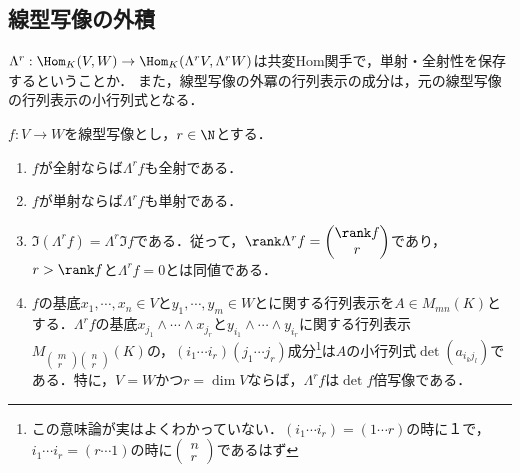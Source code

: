 \documentclass[uplatex, dvipdfmx]{jsreport}
\begin{document}
\subsection{線型写像の外積}

\begin{tcolorbox}[colframe=ForestGreen, colback=ForestGreen!10!white, breakable,
    title=線型写像の外積の構成は共変Hom関手]
    $\Lambda^r:\Hom_K(V,W)\to\Hom_K(\Lambda^rV,\Lambda^rW)$は共変Hom関手で，単射・全射性を保存するということか．
    また，線型写像の外冪の行列表示の成分は，元の線型写像の行列表示の小行列式となる．
\end{tcolorbox}

\begin{proposition}[線型写像の外積の構成は共変Hom関手]
    $f:V\to W$を線型写像とし，$r\in\N$とする．
    \begin{enumerate}
        \item $f$が全射ならば$\Lambda^rf$も全射である．
        \item $f$が単射ならば$\Lambda^rf$も単射である．
        \item $\Im(\Lambda^rf)=\Lambda^r\Im f$である．従って，$\rank\Lambda^rf=\begin{pmatrix}\rank f\\r\end{pmatrix}$であり，$r>\rank f$と$\Lambda^rf=0$とは同値である．
        \item $f$の基底$x_1,\cdots,x_n\in V$と$y_1,\cdots,y_m\in W$とに関する行列表示を$A\in M_{mn}(K)$とする．$\Lambda^rf$の基底$x_{j_1}\wedge\cdots\wedge x_{j_r}$と$y_{i_1}\wedge\cdots\wedge y_{i_r}$に関する行列表示$M_{\begin{pmatrix}m\\r\end{pmatrix}\begin{pmatrix}n\\r\end{pmatrix}}(K)$の，$(i_1\cdots i_r)(j_1\cdots j_r)$成分\footnote{この意味論が実はよくわかっていない．$(i_1\cdots i_r)=(1\cdots r)$の時に１で，$i_1\cdots i_r=(r\cdots 1)$の時に$\begin{pmatrix}n\\r\end{pmatrix}$であるはず}は$A$の小行列式$\det(a_{i_kj_l})$である．特に，$V=W$かつ$r=\dim V$ならば，$\Lambda^rf$は$\det f$倍写像である．
    \end{enumerate}
\end{proposition}
\end{document}
